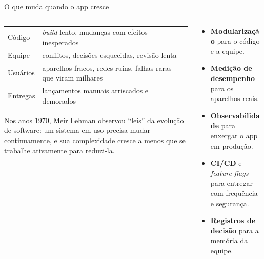 \documentclass[aspectratio=169,10pt]{beamer}
\begin{document}
\begin{frame}{O que muda quando o app cresce}
  \begin{columns}[T]
    \begin{column}{0.5\textwidth}
      \scriptsize
      \begin{tabularx}{\linewidth}{@{}l L@{}}
        \toprule
         &  \\
        \midrule
        Código & \emph{build} lento, mudanças com efeitos inesperados \\
        Equipe & conflitos, decisões esquecidas, revisão lenta \\
        Usuários & aparelhos fracos, redes ruins, falhas raras que viram milhares \\
        Entregas & lançamentos manuais arriscados e demorados \\
        \bottomrule
      \end{tabularx}
      \begin{historia}
        Nos anos 1970, Meir Lehman observou ``leis'' da evolução de software: um sistema em uso precisa mudar continuamente, e sua complexidade cresce a menos que se trabalhe ativamente para reduzi-la.
      \end{historia}
    \end{column}
    \begin{column}{0.48\textwidth}
      \begin{conceito}
        \begin{itemize}
          \item \textbf{Modularização} para o código e a equipe.
          \item \textbf{Medição de desempenho} para os aparelhos reais.
          \item \textbf{Observabilidade} para enxergar o app em produção.
          \item \textbf{CI/CD} e \emph{feature flags} para entregar com frequência e segurança.
          \item \textbf{Registros de decisão} para a memória da equipe.
        \end{itemize}
      \end{conceito}
    \end{column}
  \end{columns}
\end{frame}
\end{document}
